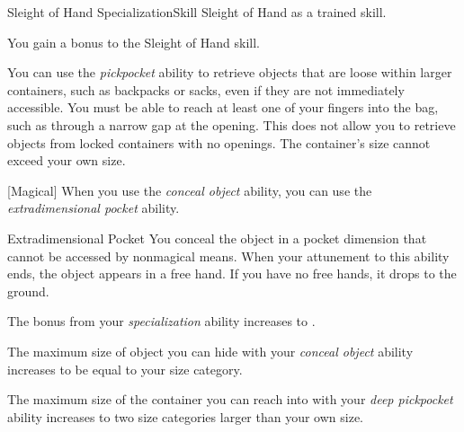     \begin{feat}{Sleight of Hand Specialization}{Skill}
        \featpre Sleight of Hand as a trained skill.

         You gain a  bonus to the Sleight of Hand skill.

         You can use the \textit{pickpocket} ability to retrieve objects that are loose within larger containers, such as backpacks or sacks, even if they are not immediately accessible.
        You must be able to reach at least one of your fingers into the bag, such as through a narrow gap at the opening.
        This does not allow you to retrieve objects from locked containers with no openings.
        The container's size cannot exceed your own size.

        [Magical] When you use the \textit{conceal object} ability, you can use the \textit{extradimensional pocket} ability.
        \begin{attuneability}{Extradimensional Pocket}{}
            \rankline
            You conceal the object in a pocket dimension that cannot be accessed by nonmagical means.
            When your attunement to this ability ends, the object appears in a free hand.
            If you have no free hands, it drops to the ground.
        \end{attuneability}

         The bonus from your \textit{specialization} ability increases to .

         The maximum size of object you can hide with your \textit{conceal object} ability increases to be equal to your size category.

         The maximum size of the container you can reach into with your \textit{deep pickpocket} ability increases to two size categories larger than your own size.
    \end{feat}

